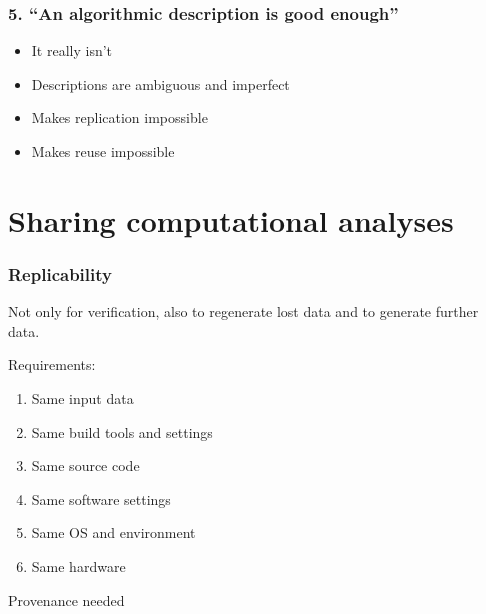 \documentclass[slidestop]{beamer}
\begin{document}
\begin{frame}
  \frametitle{5. ``An algorithmic description is good enough''}
  \pause
  \begin{itemize}
    \item It really isn't
    \item Descriptions are ambiguous and imperfect
    \item Makes replication impossible
    \item Makes reuse impossible
  \end{itemize}
\end{frame}

\section*{}


\section{Sharing computational analyses}

\begin{frame}
  \frametitle{Replicability}
  Not only for verification, also to regenerate lost data and to generate
  further data.

  \vspace{0.5cm}
  \pause

  Requirements:
  \begin{enumerate}
    \item Same input data
    \item Same build tools and settings
    \item Same source code
    \item Same software settings
    \item Same OS and environment
    \item Same hardware
  \end{enumerate}

  \vspace{0.5cm}
  \pause

  Provenance needed
\end{frame}
\end{document}
